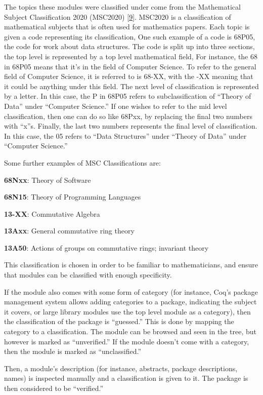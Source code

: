 \documentclass[
]{article}
\begin{document}
The topics these modules were classified under come from the
Mathematical Subject Classification 2020 (MSC2020)
{[}\protect\hyperlink{ref-msc2021}{9}{]}. MSC2020 is a classification of
mathematical subjects that is often used for mathematics papers. Each
topic is given a code representing its classification, One such example
of a code is 68P05, the code for work about data structures. The code is
split up into three sections, the top level is represented by a top
level mathematical field, For instance, the 68 in 68P05 means that it's
in the field of Computer Science. To refer to the general field of
Computer Science, it is referred to is 68-XX, with the -XX meaning that
it could be anything under this field. The next level of classification
is represented by a letter. In this case, the P in 68P05 refers to
subclassification of ``Theory of Data'' under ``Computer Science.'' If
one wishes to refer to the mid level classification, then one can do so
like 68Pxx, by replacing the final two numbers with ``x''s. Finally, the
last two numbers represents the final level of classification. In this
case, the 05 refers to ``Data Structures'' under ``Theory of Data''
under ``Computer Science.''

Some further examples of MSC Classifications are:

\textbf{68Nxx}: Theory of Software

\textbf{68N15}: Theory of Programming Languages

\textbf{13-XX}: Commutative Algebra

\textbf{13Axx}: General commutative ring theory

\textbf{13A50}: Actions of groups on commutative rings; invariant theory

This classification is chosen in order to be familiar to mathematicians,
and ensure that modules can be classified with enough specificity.

If the module also comes with some form of category (for instance, Coq's
package management system allows adding categories to a package,
indicating the subject it covers, or large library modules use the top
level module as a category), then the classification of the package is
``guessed.'' This is done by mapping the category to a classification.
The module can be browsed and seen in the tree, but however is marked as
``unverified.'' If the module doesn't come with a category, then the
module is marked as ``unclassified.''

Then, a module's description (for instance, abstracts, package
descriptions, names) is inspected manually and a classification is given
to it. The package is then considered to be ``verified.''
\end{document}
